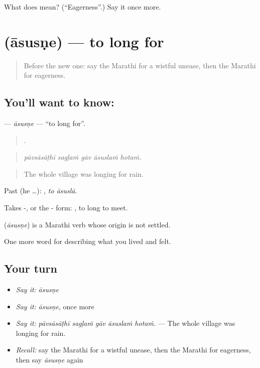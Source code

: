 \begin{tcolorbox}[breakable,colback=teal!4,colframe=teal!35!black,title={Before you move on}]
What does  mean? (\textquotedblleft{}Eagerness\textquotedblright{}.) Say it once more.
\end{tcolorbox}
\section[\texorpdfstring{\mr{आसुसणे} (āsusṇe)}{आसुसणे (āsusṇe)}]{ (āsusṇe) — to long for}

\label{lesson:MR-C459-asusne}



\begin{quote}
Before the new one: say the Marathi for a wistful unease, then the Marathi for eagerness.
\end{quote}

\subsection*{You'll want to know: }
\textbf{} — \emph{āsusṇe} — \textquotedblleft{}to long for\textquotedblright{}.

\begin{quote}
    .
\end{quote}

\begin{quote}
\emph{pāvsāsāṭhī sagḷaṁ gāv āsuslaṁ hotaṁ.}
\end{quote}

\begin{quote}
The whole village was longing for rain.
\end{quote}

Past (he …):  , \emph{to āsuslā}.

Takes -, or the - form:  , to long to meet.

\begin{cousinweb}
\textbf{} (\emph{āsusṇe}) is a Marathi verb whose origin is not settled.
\end{cousinweb}

\begin{grammarlens}[title={What you've built}]
One more word for describing what you lived and felt.
\end{grammarlens}

\subsection*{Your turn}
\begin{itemize}
\raggedright
  \item \emph{Say it:} \emph{āsusṇe}
  \item \emph{Say it:} \emph{āsusṇe}, once more
  \item \emph{Say it:} \emph{pāvsāsāṭhī sagḷaṁ gāv āsuslaṁ hotaṁ.} — The whole village was longing for rain.
  \item \emph{Recall:} say the Marathi for a wistful unease, then the Marathi for eagerness, then say \emph{āsusṇe} again
\end{itemize}

